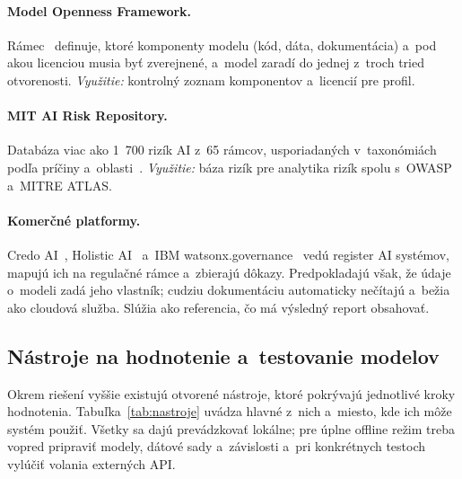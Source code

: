 \paragraph{Model Openness Framework.} Rámec~\cite{white2024mof} definuje,
ktoré komponenty modelu (kód, dáta, dokumentácia) a~pod akou licenciou
musia byť zverejnené, a~model zaradí do jednej z~troch tried otvorenosti.
\emph{Využitie:} kontrolný zoznam komponentov a~licencií pre profil.

\paragraph{MIT AI Risk Repository.} Databáza viac ako 1~700 rizík AI
z~65 rámcov, usporiadaných v~taxonómiách podľa príčiny
a~oblasti~\cite{mit-airisk}. \emph{Využitie:} báza rizík pre analytika
rizík spolu s~OWASP a~MITRE ATLAS.

\paragraph{Komerčné platformy.} Credo AI~\cite{credoai}, Holistic
AI~\cite{holisticai-platform} a~IBM watsonx.governance~\cite{watsonx-governance}
vedú register AI systémov, mapujú ich na regulačné rámce a~zbierajú
dôkazy. Predpokladajú však, že údaje o~modeli zadá jeho vlastník; cudziu
dokumentáciu automaticky nečítajú a~bežia ako cloudová služba. Slúžia ako
referencia, čo má výsledný report obsahovať.

\subsection{Nástroje na hodnotenie a~testovanie modelov}
\label{sec:nastroje}

Okrem riešení vyššie existujú otvorené nástroje, ktoré pokrývajú
jednotlivé kroky hodnotenia. Tabuľka~\ref{tab:nastroje} uvádza hlavné
z~nich a~miesto, kde ich môže systém použiť. Všetky sa dajú prevádzkovať
lokálne; pre úplne offline režim treba vopred pripraviť modely, dátové
sady a~závislosti a~pri konkrétnych testoch vylúčiť volania externých API.

